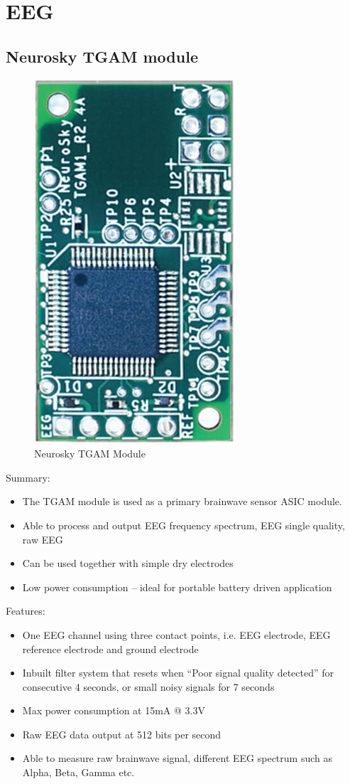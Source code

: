 \section{EEG}

\subsection{Neurosky TGAM module}

\begin{figure}[H]
	\centering
	\includegraphics[width=0.25\linewidth,angle=270,origin=c]{jiahuipic2.jpg}
	\caption{Neurosky TGAM Module \cite{jiahui12}}
\end{figure}

Summary:
\begin{itemize}
\item	The TGAM module is used as a primary brainwave sensor ASIC module.
\item	Able to process and output EEG frequency spectrum, EEG single quality, raw EEG 
\item	Can be used together with simple dry electrodes
\item	Low power consumption – ideal for portable battery driven application
\end{itemize}

Features:
\begin{itemize}
\item	One EEG channel using three contact points, i.e. EEG electrode, EEG reference electrode and ground electrode
\item	Inbuilt filter system that resets when “Poor signal quality detected” for consecutive 4 seconds, or small noisy signals for 7 seconds
\item	Max power consumption at 15mA @ 3.3V
\item	Raw EEG data output at 512 bits per second
\item	Able to measure raw brainwave signal, different EEG spectrum such as Alpha, Beta, Gamma etc. 
\end{itemize}

